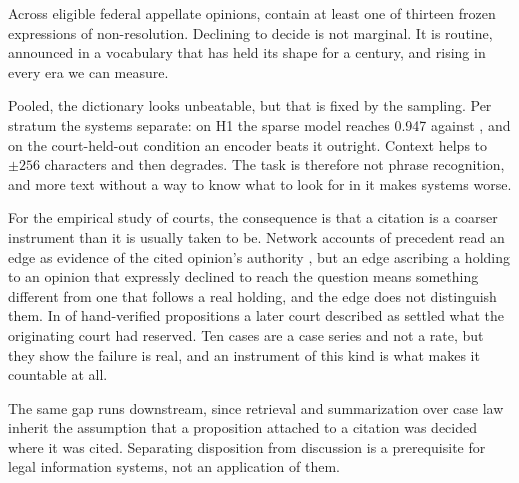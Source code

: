 Across \NEligible{} eligible federal appellate opinions, \Prevalence{} contain
at least one of thirteen frozen expressions of non-resolution. Declining to
decide is not marginal. It is routine, announced in a vocabulary that has held
its shape for a century, and rising in every era we can measure.

Pooled, the dictionary looks unbeatable, but that is fixed by the sampling. Per
stratum the systems separate: on H1 the sparse model reaches 0.947 against
\LexHOne{}, and on the court-held-out condition an encoder beats it outright.
Context helps to \(\pm256\) characters and then degrades. The task is therefore
not phrase recognition, and more text without a way to know what to look for in
it makes systems worse.

For the empirical study of courts, the consequence is that a citation is a
coarser instrument than it is usually taken to be. Network accounts of precedent
read an edge as evidence of the cited opinion's authority
\citep{fowler2007network, black2013citation}, but an edge ascribing a holding to
an opinion that expressly declined to reach the question means something
different from one that follows a real holding, and the edge does not distinguish
them. In \NIMEsc{} of \NIMDistinct{} hand-verified propositions a later court
described as settled what the originating court had reserved. Ten cases are a
case series and not a rate, but they show the failure is real, and an instrument
of this kind is what makes it countable at all.

The same gap runs downstream, since retrieval and summarization over case law
inherit the assumption that a proposition attached to a citation was decided
where it was cited. Separating disposition from discussion is a prerequisite for
legal information systems, not an application of them.
